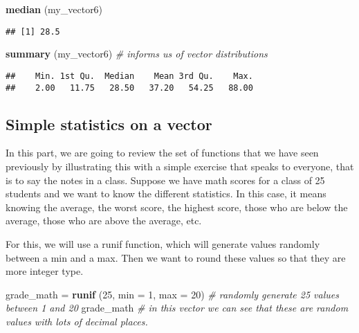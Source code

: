 \documentclass[
]{article}
\newenvironment{Shaded}{\begin{snugshade}}{\end{snugshade}}
\newcommand{\AttributeTok}[1]{\textcolor[rgb]{0.13,0.29,0.53}{#1}}
\newcommand{\CommentTok}[1]{\textcolor[rgb]{0.56,0.35,0.01}{\textit{#1}}}
\newcommand{\DecValTok}[1]{\textcolor[rgb]{0.00,0.00,0.81}{#1}}
\newcommand{\FunctionTok}[1]{\textcolor[rgb]{0.13,0.29,0.53}{\textbf{#1}}}
\newcommand{\NormalTok}[1]{#1}
\newcommand{\OtherTok}[1]{\textcolor[rgb]{0.56,0.35,0.01}{#1}}
\begin{document}
\begin{Shaded}
\begin{Highlighting}[]
\FunctionTok{median}\NormalTok{ (my\_vector6)}
\end{Highlighting}
\end{Shaded}

\begin{verbatim}
## [1] 28.5
\end{verbatim}

\begin{Shaded}
\begin{Highlighting}[]
\FunctionTok{summary}\NormalTok{ (my\_vector6) }\CommentTok{\# informs us of vector distributions}
\end{Highlighting}
\end{Shaded}

\begin{verbatim}
##    Min. 1st Qu.  Median    Mean 3rd Qu.    Max. 
##    2.00   11.75   28.50   37.20   54.25   88.00
\end{verbatim}

\hypertarget{simple-statistics-on-a-vector}{%
\subsection{Simple statistics on a
vector}\label{simple-statistics-on-a-vector}}

In this part, we are going to review the set of functions that we have
seen previously by illustrating this with a simple exercise that speaks
to everyone, that is to say the notes in a class. Suppose we have math
scores for a class of 25 students and we want to know the different
statistics. In this case, it means knowing the average, the worst score,
the highest score, those who are below the average, those who are above
the average, etc.

For this, we will use a runif function, which will generate values
randomly between a min and a max. Then we want to round these values so
that they are more integer type.

\begin{Shaded}
\begin{Highlighting}[]
\NormalTok{grade\_math }\OtherTok{=} \FunctionTok{runif}\NormalTok{ (}\DecValTok{25}\NormalTok{, }\AttributeTok{min =} \DecValTok{1}\NormalTok{, }\AttributeTok{max =} \DecValTok{20}\NormalTok{) }\CommentTok{\# randomly generate 25 values between 1 and 20}
\NormalTok{grade\_math }\CommentTok{\# in this vector we can see that these are random values with lots of decimal places.}
\end{Highlighting}
\end{Shaded}
\end{document}
